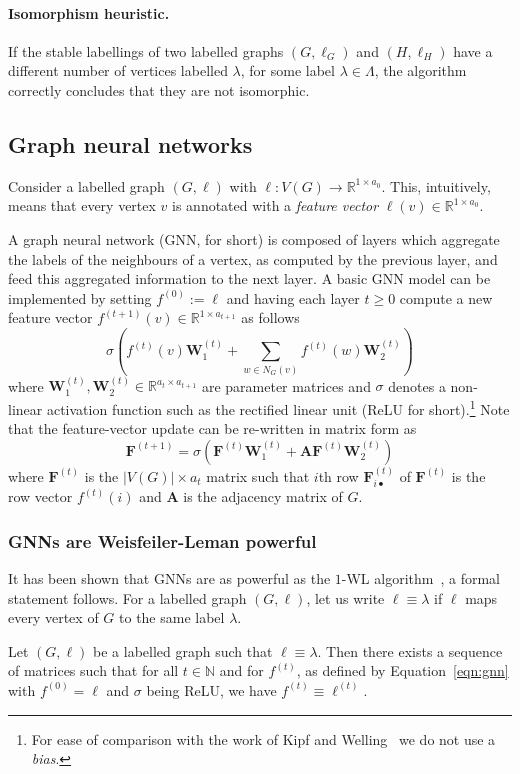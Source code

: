 \paragraph{Isomorphism heuristic.} 
If the stable labellings of two labelled graphs $(G,\ell_G)$ and $(H,\ell_H)$
have a different number of vertices labelled $\lambda$, for some label
$\lambda \in \Lambda$, the algorithm correctly concludes that they are not
isomorphic.

\subsection{Graph neural networks}
Consider a labelled graph $(G,\ell)$ with $\ell : V(G) \to \mathbb{R}^{1
\times a_0}$.  This, intuitively, means that every vertex $v$ is annotated
with a \emph{feature vector} $\ell(v) \in \mathbb{R}^{1 \times a_0}$.

A graph neural network (GNN, for short) is composed of layers which aggregate
the labels of the neighbours of a vertex, as computed by the previous layer,
and feed this aggregated information to the next layer.  A basic GNN model can
be implemented by setting $f^{(0)} := \ell$ and having each layer $t \geq 0$
compute a new feature vector $f^{(t+1)}(v) \in \mathbb{R}^{1 \times a_{t+1}}$ as
follows
\[
  \sigma\left(
    f^{(t)}(v) \mathbf{W}_1^{(t)} +
    \sum_{w \in N_G(v)} f^{(t)}(w) \mathbf{W}_2^{(t)}
  \right)
\]
where $\mathbf{W}_1^{(t)}, \mathbf{W}_2^{(t)} \in \mathbb{R}^{a_t \times
a_{t+1}}$ are parameter matrices and $\sigma$ denotes a non-linear activation
function such as the rectified linear unit (ReLU for short).\footnote{For ease
of comparison with the work of Kipf and Welling~ we do
not use a \emph{bias}.}
Note that the feature-vector update can be re-written in matrix
form as
\begin{equation}\label{eqn:gnn}
  \mathbf{F}^{(t+1)} = \sigma\left(
    \mathbf{F}^{(t)}\mathbf{W}_1^{(t)} +
    \mathbf{AF}^{(t)}\mathbf{W}_2^{(t)}
  \right)
\end{equation}
where $\mathbf{F}^{(t)}$ is the $|V(G)| \times a_t$ matrix such that $i$th row 
$\mathbf{F}^{(t)}_{i\bullet}$ of  $\mathbf{F}^{(t)}$ is the row vector $f^{(t)}(i)$ and $\mathbf{A}$ is the
adjacency matrix of $G$.

\subsubsection{GNNs are Weisfeiler-Leman powerful}
It has been shown that GNNs are as powerful as the $1$-WL
algorithm~\cite{grohewl}, a formal statement follows. For a labelled graph
$(G, \ell)$, let us write $\ell \equiv \lambda$ if $\ell$ maps every vertex of
$G$ to the same label $\lambda$.
\begin{proposition}\label{pro:grohe}
  Let $(G,\ell)$ be a labelled graph such that $\ell \equiv \lambda$. Then
  there exists a sequence of matrices such that for all $t \in \mathbb{N}$ and
  for $f^{(t)}$, as defined by Equation~\eqref{eqn:gnn} with $f^{(0)} = \ell$
  and $\sigma$ being ReLU, we have $f^{(t)} \equiv \ell^{(t)}$.
\end{proposition}

